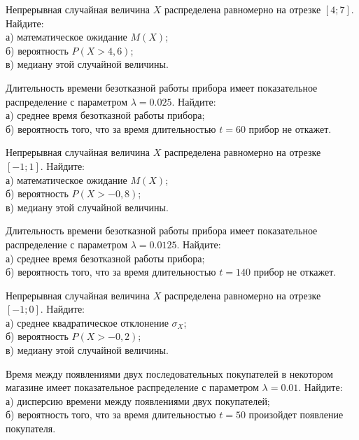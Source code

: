 \vfill

\newpage\setcounter{zad}{0}

\z Непрерывная случайная величина $X$ распределена равномерно на отрезке $[4; 7]$. Найдите: \\ \quad а) математическое ожидание $M(X)$; \\ \quad б) вероятность $P(X>4{,}6)$; \\ \quad в) медиану этой случайной величины.


\vfill

\z Длительность времени безотказной работы прибора имеет показательное распределение с параметром $\lambda = 0.025$. Найдите: \\ \quad а) среднее время безотказной работы прибора; \\ \quad б) вероятность того, что за время длительностью $t = 60$ прибор не откажет.
 

\vfill

\newpage\setcounter{zad}{0}

\z Непрерывная случайная величина $X$ распределена равномерно на отрезке $[-1; 1]$. Найдите: \\ \quad а) математическое ожидание $M(X)$; \\ \quad б) вероятность $P(X>-0{,}8)$; \\ \quad в) медиану этой случайной величины.


\vfill

\z Длительность времени безотказной работы прибора имеет показательное распределение с параметром $\lambda = 0.0125$. Найдите: \\ \quad а) среднее время безотказной работы прибора; \\ \quad б) вероятность того, что за время длительностью $t = 140$ прибор не откажет.
 

\vfill

\newpage\setcounter{zad}{0}

\z Непрерывная случайная величина $X$ распределена равномерно на отрезке $[-1; 0]$. Найдите: \\ \quad а) среднее квадратическое отклонение $\sigma_X$; \\ \quad б) вероятность $P(X>-0{,}2)$; \\ \quad в) медиану этой случайной величины.


\vfill

\z Время между появлениями двух последовательных покупателей в некотором магазине имеет показательное распределение с параметром $\lambda = 0.01$. Найдите: \\ \quad а) дисперсию времени между появлениями двух покупателей; \\ \quad б) вероятность того, что за время длительностью $t = 50$  произойдет появление покупателя.
 

